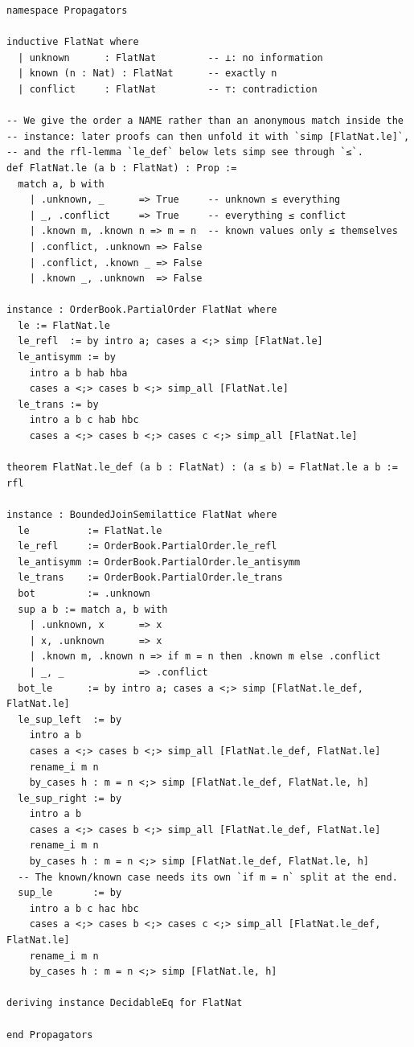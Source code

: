 \documentclass[12pt, a4paper, openright]{book}
\theoremstyle{thmstyle}
\theoremstyle{defstyle}
\begin{document}
\begin{verbatim}
namespace Propagators

inductive FlatNat where
  | unknown      : FlatNat         -- ⊥: no information
  | known (n : Nat) : FlatNat      -- exactly n
  | conflict     : FlatNat         -- ⊤: contradiction

-- We give the order a NAME rather than an anonymous match inside the
-- instance: later proofs can then unfold it with `simp [FlatNat.le]`,
-- and the rfl-lemma `le_def` below lets simp see through `≤`.
def FlatNat.le (a b : FlatNat) : Prop :=
  match a, b with
    | .unknown, _      => True     -- unknown ≤ everything
    | _, .conflict     => True     -- everything ≤ conflict
    | .known m, .known n => m = n  -- known values only ≤ themselves
    | .conflict, .unknown => False
    | .conflict, .known _ => False
    | .known _, .unknown  => False

instance : OrderBook.PartialOrder FlatNat where
  le := FlatNat.le
  le_refl  := by intro a; cases a <;> simp [FlatNat.le]
  le_antisymm := by
    intro a b hab hba
    cases a <;> cases b <;> simp_all [FlatNat.le]
  le_trans := by
    intro a b c hab hbc
    cases a <;> cases b <;> cases c <;> simp_all [FlatNat.le]

theorem FlatNat.le_def (a b : FlatNat) : (a ≤ b) = FlatNat.le a b := rfl

instance : BoundedJoinSemilattice FlatNat where
  le          := FlatNat.le
  le_refl     := OrderBook.PartialOrder.le_refl
  le_antisymm := OrderBook.PartialOrder.le_antisymm
  le_trans    := OrderBook.PartialOrder.le_trans
  bot         := .unknown
  sup a b := match a, b with
    | .unknown, x      => x
    | x, .unknown      => x
    | .known m, .known n => if m = n then .known m else .conflict
    | _, _             => .conflict
  bot_le      := by intro a; cases a <;> simp [FlatNat.le_def, FlatNat.le]
  le_sup_left  := by
    intro a b
    cases a <;> cases b <;> simp_all [FlatNat.le_def, FlatNat.le]
    rename_i m n
    by_cases h : m = n <;> simp [FlatNat.le_def, FlatNat.le, h]
  le_sup_right := by
    intro a b
    cases a <;> cases b <;> simp_all [FlatNat.le_def, FlatNat.le]
    rename_i m n
    by_cases h : m = n <;> simp [FlatNat.le_def, FlatNat.le, h]
  -- The known/known case needs its own `if m = n` split at the end.
  sup_le       := by
    intro a b c hac hbc
    cases a <;> cases b <;> cases c <;> simp_all [FlatNat.le_def, FlatNat.le]
    rename_i m n
    by_cases h : m = n <;> simp [FlatNat.le, h]

deriving instance DecidableEq for FlatNat

end Propagators
\end{verbatim}
\end{document}
